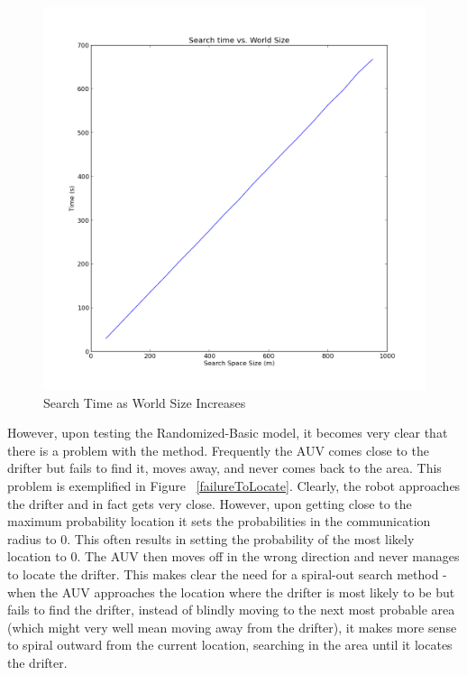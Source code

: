 \documentclass[a4paper, 11pt]{article} %
\begin{document}
\begin{figure}[H]
	\begin{center}
		\includegraphics[scale=0.30]{basic_3.png}
	\end{center}
\caption{Search Time as World Size Increases \label{timeIncrease}}
\end{figure}

\noindent However, upon testing the Randomized-Basic model, it becomes very clear that there is a problem with the method. Frequently the AUV comes close to the drifter but fails to find it, moves away, and never comes back to the area. This problem is exemplified in Figure ~\ref{failureToLocate}. Clearly, the robot approaches the drifter and in fact gets very close. However, upon getting close to the maximum probability location it sets the probabilities in the communication radius to 0. This often results in setting the probability of the most likely location to 0. The AUV then moves off in the wrong direction and never manages to locate the drifter. This makes clear the need for a spiral-out search method - when the AUV approaches the location where the drifter is most likely to be but fails to find the drifter, instead of blindly moving to the next most probable area (which might very well mean moving away from the drifter), it makes more sense to spiral outward from the current location, searching in the area until it locates the drifter.
\end{document}
